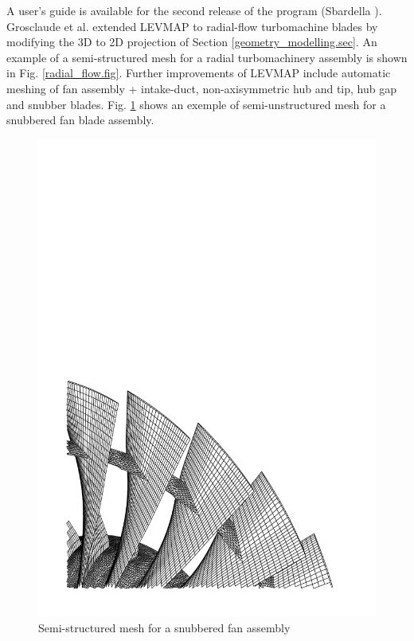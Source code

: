 %
 A user's guide is available for the second release of the program
 (Sbardella ).
 Grosclaude et al. \citeyear{Luca:8} extended LEVMAP to radial-flow
 turbomachine blades by modifying the 3D to 2D projection of
 Section \ref{geometry_modelling.sec}. An example of a semi-structured mesh
 for a radial turbomachinery assembly is shown in Fig. \ref{radial_flow.fig}.
 Further improvements of LEVMAP include automatic meshing of
 fan assembly + intake-duct, non-axisymmetric hub and tip, hub gap and
 snubber blades.
 Fig. \ref{snab_flow.fig} shows an exemple of semi-unstructured mesh for
 a snubbered fan blade assembly.
%
\begin{figure}[ht]
   \centerline{\includegraphics[width=120mm,clip=t]{CHAP_MESH/FIGURE/snab.pdf}}
   \caption{Semi-structured mesh for a snubbered fan assembly}
   \label{snab_flow.fig}
\end{figure}
%
%
%
%
